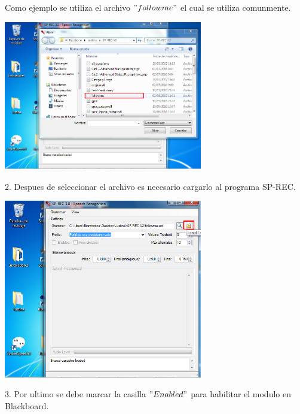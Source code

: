 \documentclass[user_manual.tex]{subfiles}
\begin{document}
Como ejemplo se utiliza el archivo $"followme"$ el cual se utiliza comunmente.

\begin{center}
\includegraphics[width=0.65\textwidth]{Figures/Puesta_marcha/SPREC_file.png}
\end{center}

2. Despues de seleccionar el archivo es necesario cargarlo al programa SP-REC.

\begin{center}
\includegraphics[width=0.65\textwidth]{Figures/Puesta_marcha/SPREC_load.png}
\end{center}

3. Por ultimo se debe marcar la casilla $"Enabled"$ para habilitar el modulo en Blackboard.
\end{document}
